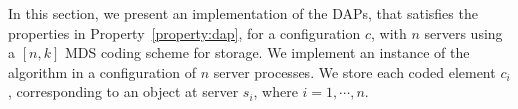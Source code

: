 
			In this section, we present an implementation of the DAPs,  that satisfies the properties in Property~\ref{property:dap},  for a configuration $c$,  with $n$ servers 
			 using a $[n, k]$ MDS coding scheme for storage. We implement an instance of the algorithm in a 
 configuration of  $n$ server processes. 
 We store each coded element $c_i$, corresponding to an object  at server $s_i$, where $i=1, \cdots, n$.
%
